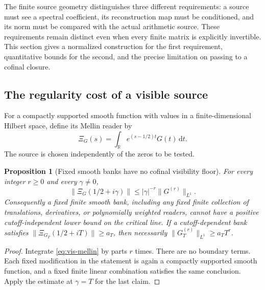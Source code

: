 \documentclass[11pt]{article}
\newtheorem{proposition}[theorem]{Proposition}
\theoremstyle{definition}
\theoremstyle{remark}
\newcommand{\R}{\mathbb R}
\newcommand{\dd}{\mathrm d}
\begin{document}
The finite source geometry distinguishes three different requirements: a
source must see a spectral coefficient, its reconstruction map must be
conditioned, and its norm must be compared with the actual arithmetic
source.  These requirements remain distinct even when every finite
matrix is explicitly invertible.  This section gives a normalized
construction for the first requirement, quantitative bounds for the
second, and the precise limitation on passing to a cofinal closure.

\subsection{The regularity cost of a visible source}

For a compactly supported smooth function with values in a finite-dimensional
Hilbert space, define its Mellin reader by
\begin{equation}
 \Xi_G(s)=\int_\R e^{(s-1/2)t}G(t)\,\dd t.
 \label{eq:vis-mellin}
\end{equation}
The source is chosen independently of the zeros to be tested.

\begin{proposition}[Fixed smooth banks have no cofinal visibility floor]
\label{prop:vis-fixed-bank}
For every integer $r\ge0$ and every $\gamma\ne0$,
\begin{equation}
 \|\Xi_G(1/2+i\gamma)\|
 \le |\gamma|^{-r}\|G^{(r)}\|_{L^1}.
 \label{eq:vis-ibp}
\end{equation}
Consequently a fixed finite smooth bank, including any fixed finite
collection of translations, derivatives, or polynomially weighted readers,
cannot have a positive cutoff-independent lower bound on the critical
line.  If a cutoff-dependent bank satisfies
$\|\Xi_{G_T}(1/2+iT)\|\ge a_T$, then necessarily
$\|G_T^{(r)}\|_{L^1}\ge a_TT^r$.
\end{proposition}

\begin{proof}
Integrate \eqref{eq:vis-mellin} by parts $r$ times.  There are no boundary
terms.  Each fixed modification in the statement is again a compactly
supported smooth function, and a fixed finite linear combination satisfies
the same conclusion.  Apply the estimate at $\gamma=T$ for the last claim.
\end{proof}
\end{document}

